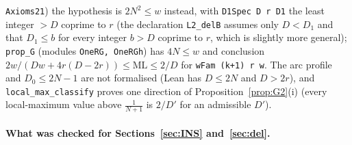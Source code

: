 \documentclass[11pt]{article}
\theoremstyle{definition}
\theoremstyle{remark}
\newcommand{\ML}{\mathrm{ML}}
\begin{document}
\texttt{Axioms21}) the hypothesis is $2N^2\le w$ instead, with \texttt{D1Spec D r D1} the least integer $>D$ coprime to $r$ (the declaration \texttt{L2\_delB} assumes only $D<D_1$ and that $D_1\le b$ for every integer $b>D$ coprime to $r$, which is slightly more general); \texttt{prop\_G} (modules \texttt{OneRG, OneRGh}) has $4N\le w$ and conclusion $2w/(Dw+4r(D-2r))\le\ML\le2/D$ for \texttt{wFam (k+1) r w}. The arc profile and $D_0\le2N-1$ are not formalised (Lean has $D\le2N$ and $D>2r$), and \texttt{local\_max\_classify} proves one direction of Proposition~\ref{prop:G2}(i) (every local-maximum value above $\frac1{N+1}$ is $2/D'$ for an admissible $D'$).

\paragraph{What was checked for Sections~\ref{sec:INS} and~\ref{sec:del}.}
\end{document}
